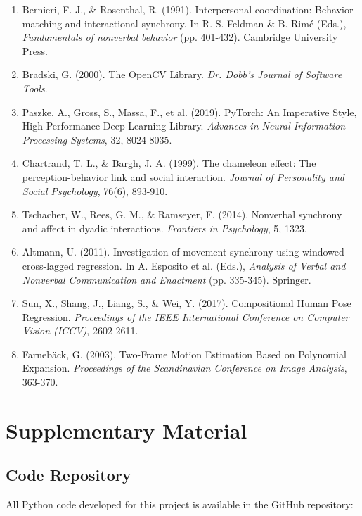 \documentclass[11pt]{article}
\begin{document}
\begin{enumerate}
    \item Bernieri, F. J., \& Rosenthal, R. (1991). Interpersonal coordination: Behavior matching and interactional synchrony. In R. S. Feldman \& B. Rimé (Eds.), \textit{Fundamentals of nonverbal behavior} (pp. 401-432). Cambridge University Press.
    
    \item Bradski, G. (2000). The OpenCV Library. \textit{Dr. Dobb's Journal of Software Tools}.
    
    \item Paszke, A., Gross, S., Massa, F., et al. (2019). PyTorch: An Imperative Style, High-Performance Deep Learning Library. \textit{Advances in Neural Information Processing Systems}, 32, 8024-8035.
    
    \item Chartrand, T. L., \& Bargh, J. A. (1999). The chameleon effect: The perception-behavior link and social interaction. \textit{Journal of Personality and Social Psychology}, 76(6), 893-910.
    
    \item Tschacher, W., Rees, G. M., \& Ramseyer, F. (2014). Nonverbal synchrony and affect in dyadic interactions. \textit{Frontiers in Psychology}, 5, 1323.
    
    \item Altmann, U. (2011). Investigation of movement synchrony using windowed cross-lagged regression. In A. Esposito et al. (Eds.), \textit{Analysis of Verbal and Nonverbal Communication and Enactment} (pp. 335-345). Springer.
    
    \item Sun, X., Shang, J., Liang, S., \& Wei, Y. (2017). Compositional Human Pose Regression. \textit{Proceedings of the IEEE International Conference on Computer Vision (ICCV)}, 2602-2611.
    
    \item Farnebäck, G. (2003). Two-Frame Motion Estimation Based on Polynomial Expansion. \textit{Proceedings of the Scandinavian Conference on Image Analysis}, 363-370.
\end{enumerate}

\section{Supplementary Material}

\subsection{Code Repository}
All Python code developed for this project is available in the GitHub repository:
\end{document}
